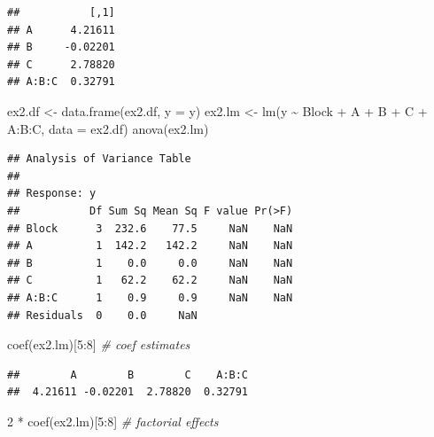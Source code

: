 \documentclass[
]{book}
\newenvironment{Shaded}{\begin{snugshade}}{\end{snugshade}}
\newcommand{\AttributeTok}[1]{\textcolor[rgb]{0.77,0.63,0.00}{#1}}
\newcommand{\CommentTok}[1]{\textcolor[rgb]{0.56,0.35,0.01}{\textit{#1}}}
\newcommand{\DecValTok}[1]{\textcolor[rgb]{0.00,0.00,0.81}{#1}}
\newcommand{\FunctionTok}[1]{\textcolor[rgb]{0.00,0.00,0.00}{#1}}
\newcommand{\NormalTok}[1]{#1}
\newcommand{\OtherTok}[1]{\textcolor[rgb]{0.56,0.35,0.01}{#1}}
\newcommand{\SpecialCharTok}[1]{\textcolor[rgb]{0.00,0.00,0.00}{#1}}
\theoremstyle{definition}
\theoremstyle{definition}
\theoremstyle{definition}
\theoremstyle{definition}
\theoremstyle{remark}
\begin{document}
\begin{verbatim}
##           [,1]
## A      4.21611
## B     -0.02201
## C      2.78820
## A:B:C  0.32791
\end{verbatim}

\begin{Shaded}
\begin{Highlighting}[]
\NormalTok{ex2.df }\OtherTok{\textless{}{-}} \FunctionTok{data.frame}\NormalTok{(ex2.df, }\AttributeTok{y =}\NormalTok{ y)}
\NormalTok{ex2.lm }\OtherTok{\textless{}{-}} \FunctionTok{lm}\NormalTok{(y }\SpecialCharTok{\textasciitilde{}}\NormalTok{  Block }\SpecialCharTok{+}\NormalTok{ A }\SpecialCharTok{+}\NormalTok{ B }\SpecialCharTok{+}\NormalTok{ C }\SpecialCharTok{+}\NormalTok{ A}\SpecialCharTok{:}\NormalTok{B}\SpecialCharTok{:}\NormalTok{C, }\AttributeTok{data =}\NormalTok{ ex2.df)}
\FunctionTok{anova}\NormalTok{(ex2.lm)}
\end{Highlighting}
\end{Shaded}

\begin{verbatim}
## Analysis of Variance Table
## 
## Response: y
##           Df Sum Sq Mean Sq F value Pr(>F)
## Block      3  232.6    77.5     NaN    NaN
## A          1  142.2   142.2     NaN    NaN
## B          1    0.0     0.0     NaN    NaN
## C          1   62.2    62.2     NaN    NaN
## A:B:C      1    0.9     0.9     NaN    NaN
## Residuals  0    0.0     NaN
\end{verbatim}

\begin{Shaded}
\begin{Highlighting}[]
\FunctionTok{coef}\NormalTok{(ex2.lm)[}\DecValTok{5}\SpecialCharTok{:}\DecValTok{8}\NormalTok{] }\CommentTok{\# coef estimates}
\end{Highlighting}
\end{Shaded}

\begin{verbatim}
##        A        B        C    A:B:C 
##  4.21611 -0.02201  2.78820  0.32791
\end{verbatim}

\begin{Shaded}
\begin{Highlighting}[]
\DecValTok{2} \SpecialCharTok{*} \FunctionTok{coef}\NormalTok{(ex2.lm)[}\DecValTok{5}\SpecialCharTok{:}\DecValTok{8}\NormalTok{] }\CommentTok{\# factorial effects}
\end{Highlighting}
\end{Shaded}
\end{document}
